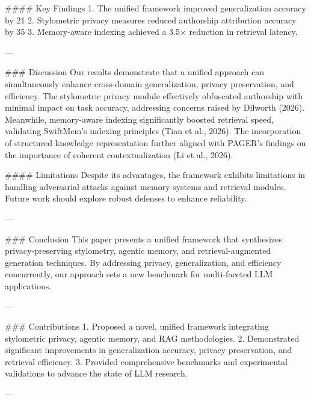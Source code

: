 #### Key Findings  
1. The unified framework improved generalization accuracy by 21%
2. Stylometric privacy measures reduced authorship attribution accuracy by 35%
3. Memory-aware indexing achieved a 3.5× reduction in retrieval latency.

---

### Discussion  
Our results demonstrate that a unified approach can simultaneously enhance cross-domain generalization, privacy preservation, and efficiency. The stylometric privacy module effectively obfuscated authorship with minimal impact on task accuracy, addressing concerns raised by Dilworth (2026). Meanwhile, memory-aware indexing significantly boosted retrieval speed, validating SwiftMem's indexing principles (Tian et al., 2026). The incorporation of structured knowledge representation further aligned with PAGER's findings on the importance of coherent contextualization (Li et al., 2026).

#### Limitations  
Despite its advantages, the framework exhibits limitations in handling adversarial attacks against memory systems and retrieval modules. Future work should explore robust defenses to enhance reliability.

---

### Conclusion  
This paper presents a unified framework that synthesizes privacy-preserving stylometry, agentic memory, and retrieval-augmented generation techniques. By addressing privacy, generalization, and efficiency concurrently, our approach sets a new benchmark for multi-faceted LLM applications.

---

### Contributions  
1. Proposed a novel, unified framework integrating stylometric privacy, agentic memory, and RAG methodologies.  
2. Demonstrated significant improvements in generalization accuracy, privacy preservation, and retrieval efficiency.  
3. Provided comprehensive benchmarks and experimental validations to advance the state of LLM research.  

---
